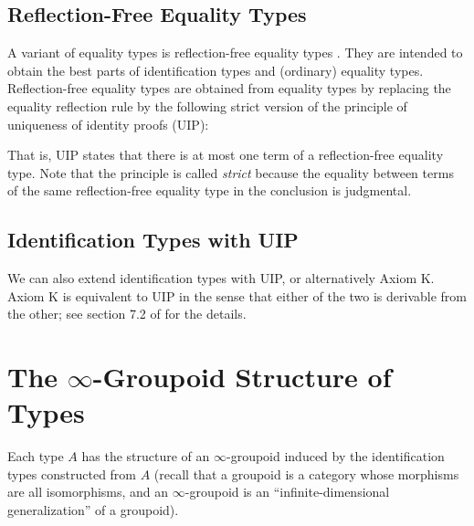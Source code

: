 \documentclass[11pt]{article}
\begin{document}
\subsection{Reflection-Free Equality Types}
A variant of equality types is reflection-free equality types \cite{sterling_et_al:LIPIcs:2019:10538}. They are intended to obtain the best parts of identification types and (ordinary) equality types. Reflection-free equality types are obtained from equality types by replacing the equality reflection rule by the following strict version of the principle of uniqueness of identity proofs (UIP):

\begin{prooftree*}
\end{prooftree*}

That is, UIP states that there is at most one term of a reflection-free equality type.
Note that the principle is called \emph{strict} because the equality between terms of the same reflection-free equality type in the conclusion is judgmental.

\subsection{Identification Types with UIP}

We can also extend identification types with UIP, or alternatively Axiom K. Axiom K is equivalent to UIP in the sense that either of the two is derivable from the other; see section 7.2 of \cite{hott-as:book} for the details.

\section{The \texorpdfstring{$\infty$}{infinity}-Groupoid Structure of Types}

\begin{theorem}
Each type $A$ has the structure of an $\infty$-groupoid induced by the identification types constructed from $A$ (recall that a groupoid is a category whose morphisms are all isomorphisms, and an $\infty$-groupoid is an ``infinite-dimensional generalization'' of a groupoid).
\end{theorem}
\end{document}
